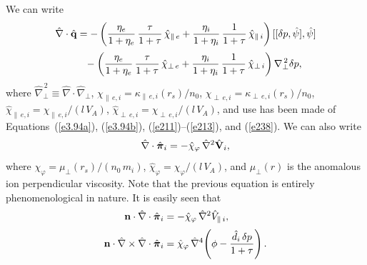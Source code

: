 \documentclass[notitlepage,12pt]{article}
\newcommand{\bpi}{\mbox{\boldmath$\pi$}}
\begin{document}
We can write
\begin{align}
\hat{\nabla}\cdot \hat{\bf q} &=- \left(\frac{\eta_e}{1+\eta_e}\,\frac{\tau}{1+\tau}\,\hat{\chi}_{\parallel\,e} + \frac{\eta_i}{1+\eta_i}\,\frac{1}{1+\tau}\,\hat{\chi}_{\parallel\,i}\right)[[\delta p,\hat{\psi}],\hat{\psi}]\nonumber\\[0.5ex]
&\phantom{=} - \left(\frac{\eta_e}{1+\eta_e}\,\frac{\tau}{1+\tau}\,\hat{\chi}_{\perp\,e} + \frac{\eta_i}{1+\eta_i}\,\frac{1}{1+\tau}\,\hat{\chi}_{\perp\,i}\right)\nabla_\perp^{\,2} \delta p,\label{e260}
\end{align}
where $\hat{\nabla}_\perp^{\,2}\equiv \hat{\nabla}\cdot\hat{\nabla}_\perp$, $\chi_{\parallel\,e,i} = \kappa_{\parallel\,e,i}(r_s)/n_0$, $\chi_{\perp\,e,i} = \kappa_{\perp\,e,i}(r_s)/n_0$, $\hat{\chi}_{\parallel\,e,i}=
\chi_{\parallel\,e,i}/(l\,V_A)$,  $\hat{\chi}_{\perp\,e,i}=
\chi_{\perp\,e,i}/(l\,V_A)$, and use has been made of Equations~(\ref{e3.94a}),  (\ref{e3.94b}), (\ref{e211})--(\ref{e213}), and (\ref{e238}). 
We can also
write
\begin{equation}
\hat{\nabla}\cdot\hat{\bpi}_i =- \hat{\chi}_\varphi\,\hat{\nabla}^2\hat{\bf V}_i,
\end{equation}
where $\chi_\varphi = \mu_{\perp}(r_s)/(n_0\,m_i)$, $\hat{\chi}_\varphi = \chi_\varphi/(l\,V_A)$, and $\mu_\perp(r)$ is the anomalous
ion perpendicular viscosity. Note that the previous equation is entirely phenomenological in nature.  It is easily seen that
\begin{align}\label{e262}
{\bf n}\cdot\hat{\nabla}\cdot\hat{\bpi}_i&= -\hat{\chi}_\varphi\,\hat{\nabla}^{2}\hat{V}_{\parallel\,i},\\[0.5ex]
{\bf n}\cdot\hat{\nabla}\times \hat{\nabla}\cdot\hat{\bpi}_i&= \hat{\chi}_\varphi \,\hat{\nabla}^4\!\left(\phi - \frac{\hat{d}_i\,\delta p}{1+\tau}\right).\label{e263}
\end{align}
\end{document}
